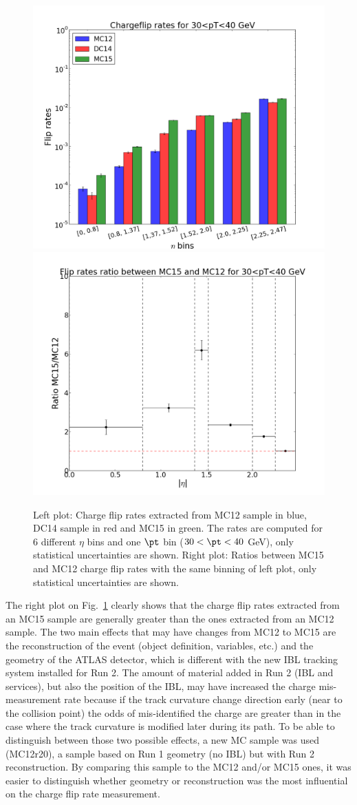 \begin{figure}[!htb]
\begin{center}
\includegraphics[width=0.4\linewidth]{FIGURES/BKG/chargeFlip/APPENDIX/fliprates_MC12/fliprates_3samples_30.png}
\includegraphics[width=0.4\linewidth]{FIGURES/BKG/chargeFlip/APPENDIX/ratio_MC15vsMC12/ratio_plot_30.png}
\end{center}
\caption{\label{fig:12vs15} Left plot: Charge flip rates extracted from MC12 sample in blue, DC14 sample in red and MC15 in green. The rates are computed for 6 different $\eta$ bins and one $\pt$ bin ($30<\pt<40$ GeV), only statistical uncertainties are shown. Right plot: Ratios between MC15 and MC12 charge flip rates with the same binning of left plot, only statistical uncertainties are shown.}
\end{figure}

The right plot on Fig.~\ref{fig:12vs15} clearly shows that the charge flip rates extracted from an MC15 sample are generally greater than the ones extracted from an MC12 sample. The two main effects that may have changes from MC12 to MC15 are the reconstruction of the event (object definition, variables, etc.) and the geometry of the ATLAS detector, which is different with the new IBL tracking system installed for Run 2. The amount of material added in Run 2 (IBL and services), but also the position of the IBL, may have increased the charge mis-measurement rate because if the track curvature change direction early (near to the collision point) the odds of mis-identified the charge are greater than in the case where the track curvature is modified later during its path. To be able to distinguish between those two possible effects, a new MC sample was used (MC12r20), a sample based on Run 1 geometry (no IBL) but with Run 2 reconstruction. By comparing this sample to the MC12 and/or MC15 ones, it was easier to distinguish whether geometry or reconstruction was the most influential on the charge flip rate measurement.

